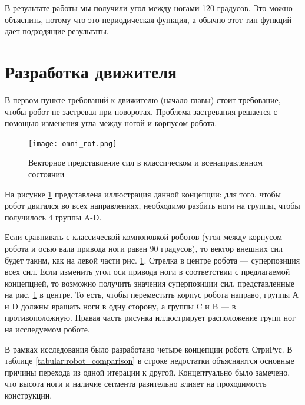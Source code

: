 В результате работы мы получили угол между ногами 120 градусов. Это можно объяснить, потому что это периодическая функция, а обычно этот тип функций дает подходящие результаты.

\section{Разработка движителя}

В первом пункте требований к движителю (начало главы) стоит требование, чтобы робот не застревал при поворотах. Проблема застревания решается с помощью изменения угла между ногой и корпусом робота.

\begin{figure}[H]
    \centering\texttt{[image: omni\_rot.png]}
    \caption{Векторное представление сил в классическом и всенаправленном состоянии}
    \label{fig:omnidirection}
\end{figure}

На рисунке \ref{fig:omnidirection} представлена иллюстрация данной концепции: для того, чтобы робот двигался во всех направлениях, необходимо разбить ноги на группы, чтобы получилось 4 группы A-D.

Если сравнивать с классической компоновкой роботов (угол между корпусом робота и осью вала привода ноги равен 90 градусов), то вектор внешних сил будет таким, как на левой части рис. \ref{fig:omnidirection}. Стрелка в центре робота — суперпозиция всех сил. Если изменить угол оси привода ноги в соответствии с предлагаемой концепцией, то возможно получить значения суперпозиции сил, представленные на рис. \ref{fig:omnidirection} в центре. То есть, чтобы переместить корпус робота направо, группы А и D должны вращать ноги в одну сторону, а группы C и B — в противоположную. Правая часть рисунка иллюстрирует расположение групп ног на исследуемом роботе. 

В рамках исследования было разработано четыре концепции робота СтриРус. В таблице \ref{tabular:robot_comparison} в строке недостатки объясняются основные причины перехода из одной итерации к другой. Концептуально было замечено, что высота ноги и наличие сегмента разительно влияет на проходимость конструкции. \quad {}

